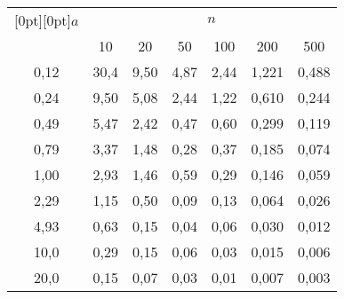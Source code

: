    \begin{table*}\small
 \begin{center}
\parbox{296pt}{
}

\vspace*{2ex}

\tabcolsep=12pt
\begin{tabular}{|c|c|c|c|c|c|c|}
 \hline
\multicolumn{1}{|c|}{\raisebox{-6pt}[0pt][0pt]{$a$}}&\multicolumn{6}{c|}{$n$}\\
\cline{2-7}
& 10 & 20 & 50 & 100 & 200 & 500\\
 \hline
 0{,}12 & 30{,}4 & 9{,}50 & 4{,}87 & 2{,}44 & 1{,}221 & 0{,}488 \\
 0{,}24 & 9{,}50 & 5{,}08 & 2{,}44 & 1{,}22 & 0{,}610 & 0{,}244 \\
 0{,}49 & 5{,}47 & 2{,}42 & 0{,}47 & 0{,}60 & 0{,}299 & 0{,}119 \\
 0{,}79 & 3{,}37 & 1{,}48 & 0{,}28 & 0{,}37 & 0{,}185 & 0{,}074 \\
 1{,}00 & 2{,}93 & 1{,}46 & 0{,}59 & 0{,}29 & 0{,}146 & 0{,}059 \\
 2{,}29 & 1{,}15 & 0{,}50 & 0{,}09 & 0{,}13 & 0{,}064 & 0{,}026 \\
 4{,}93 & 0{,}63 & 0{,}15 & 0{,}04 & 0{,}06 & 0{,}030 & 0{,}012 \\
 10{,}0 & 0{,}29 & 0{,}15 & 0{,}06 & 0{,}03 & 0{,}015 & 0{,}006 \\
 20{,}0 & 0{,}15 & 0{,}07 & 0{,}03 & 0{,}01 & 0{,}007 & 0{,}003\\
 \hline
\end{tabular}
\end{center}
\vspace*{18pt}
 \begin{center}
\parbox{296pt}{
}

\vspace*{2ex}


\end{center}
\end{table*}
